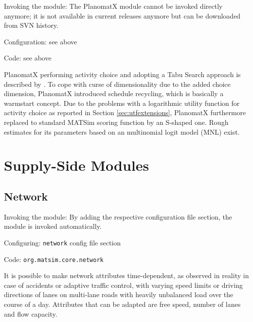 {\color{lightgray}\tiny

\begin{compactitem}
\item Invoking the module: The PlanomatX module cannot be invoked directly anymore; it is not available in current releases anymore but can be downloaded from SVN history.
\item Configuration: see above
\item Code: see above
\end{compactitem}

PlanomatX performing activity choice and adopting a Tabu Search approach is described by \citet[][]{Feil_PhDThesis_2010}. To cope with curse of dimensionality due to the added choice dimension, PlanomatX introduced schedule recycling, which is basically a warmstart concept. Due to the problems with a logarithmic utility function for activity choice as reported in Section \ref{sec:utfextensions}, PlanomatX furthermore replaced to standard MATSim scoring function by an S-shaped one. Rough estimates for its parameters based on an multinomial logit model (MNL) exist.
}

\section{Supply-Side Modules}
\label{sec:supplysidemodules}

\subsection{Network}
\label{sec:network}
\begin{compactitem}
\item Invoking the module: By adding the respective configuration file section, the module is invoked automatically.
\item Configuring: \lstinline|network| config file section
\item Code: \lstinline|org.matsim.core.network|
\end{compactitem}

It is possible to make network attributes time-dependent, as observed in reality in case of accidents or adaptive traffic control, with varying speed limits or driving directions of lanes on multi-lane roads with heavily unbalanced load over the course of a day. Attributes that can be adapted are free speed, number of lanes and flow capacity.

